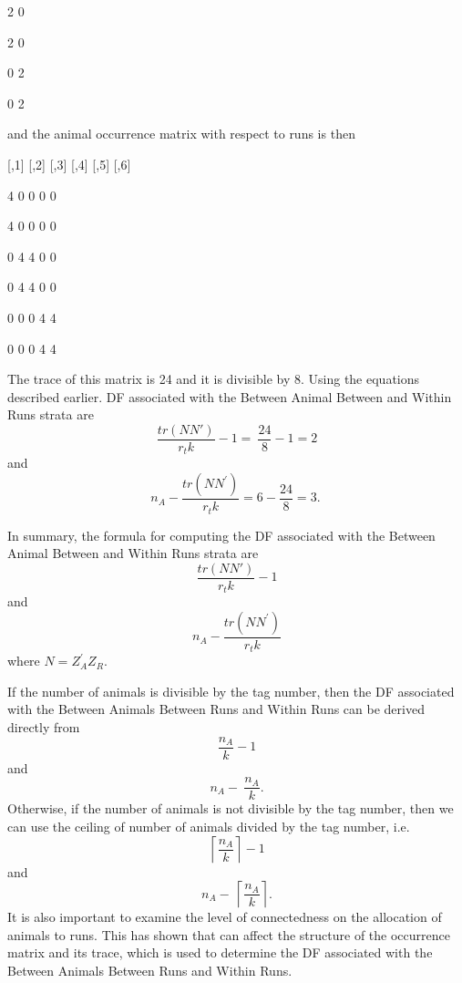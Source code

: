     2    0

    2    0

    0    2

    0    2

\noindent 

\noindent and the animal occurrence matrix with respect to runs is then 

     [,1] [,2] [,3] [,4] [,5] [,6]

    4    0    0    0    0

    4    0    0    0    0

    0    4    4    0    0

    0    4    4    0    0

    0    0    0    4    4

    0    0    0    4    4

\noindent 

\noindent The trace of this matrix is 24 and it is divisible by 8. Using the equations described earlier. DF associated with the Between Animal Between and Within Runs strata are  
\[\frac{tr(NN')}{r_tk}-1=\ \frac{24}{8}-1=2\] 
and
\[n_A-\frac{tr\left(NN^'\right)}{r_tk}=6-\frac{24}{8}=3.\ \] 


\noindent In summary, the formula for computing the DF associated with the Between Animal Between and Within Runs strata are  
\[\frac{tr(NN')}{r_tk}-1\] 
and 
\[n_A-\frac{tr\left(NN^'\right)}{r_tk}\] 
where $N=Z^'_AZ_R$.

\noindent If the number of animals is divisible by the tag number, then the DF associated with the Between Animals Between Runs and Within Runs can be derived directly from 
\[\frac{n_A}{k}-1\] 
and  
\[n_A-\ \frac{n_A}{k}.\] 
Otherwise, if the number of animals is not divisible by the tag number, then we can use the ceiling of number of animals divided by the tag number, i.e. 
\[\left\lceil \frac{n_A}{k}\right\rceil -1\] 
and  
\[n_A-\ \left\lceil \frac{n_A}{k}\right\rceil .\] 
It is also important to examine the level of connectedness on the allocation of animals to runs. This has shown that can affect the structure of the occurrence matrix and its trace, which is used to determine the DF associated with the Between Animals Between Runs and Within Runs.

\noindent 

\noindent 


